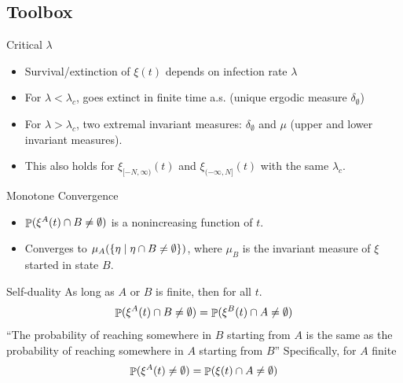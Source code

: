 \documentclass{beamer}
\begin{document}
\subsection{Toolbox}

\begin{frame}{Critical $\lambda$}
  \begin{itemize}
    \item Survival/extinction of $\xi(t)$ depends on infection rate $\lambda$
          \pause
    \item For $\lambda < \lambda_{c}$, goes extinct in finite time a.s. (unique ergodic measure $\delta_{\emptyset}$)
          \pause
    \item For $\lambda > \lambda_{c}$, two extremal invariant measures: $\delta_{\emptyset}$ and $\mu$ (upper and lower invariant measures).
          \pause
    \item This also holds for $\xi_{[-N,\infty)}(t)$ and $\xi_{(-\infty,N]}(t)$ with the same $\lambda_c$.
  \end{itemize}
\end{frame}

\begin{frame}{Monotone Convergence}
  \begin{itemize}
    \item $\mathop{\mathbb{P}}(\xi^{A}(t) \cap B \neq \emptyset)$ is a nonincreasing function of $t$.
      \pause
    \item Converges to $\mu_{A}(\{\eta \mid \eta \cap B \neq \emptyset\})$, where $\mu_{B}$ is the invariant measure of $\xi$ started in state $B$.
  \end{itemize}
\end{frame}

\begin{frame}{Self-duality}
  As long as $A$ or $B$ is finite, then for all $t$.
  \begin{equation}
    \mathop{\mathbb{P}}(\xi^{A}(t) \cap B \neq \emptyset) = \mathop{\mathbb{P}}(\xi^{B}(t) \cap A \neq \emptyset)
  \end{equation}
  \pause
  ``The probability of reaching somewhere in $B$ starting from $A$ is the same as the probability of reaching somewhere in $A$ starting from $B$''
  \pause
  Specifically, for $A$ finite
  \begin{equation}
    \mathop{\mathbb{P}}(\xi^{A}(t) \neq \emptyset) = \mathop{\mathbb{P}}(\xi(t) \cap A \neq \emptyset)
  \end{equation}
\end{frame}
\end{document}
